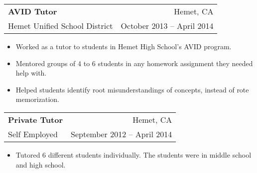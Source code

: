 \documentclass[12pt]{article}
\newenvironment{compactItemize}{
  \begin{itemize}[itemsep=0ex, parsep=0ex, partopsep=0ex, topsep= -7pt]
}{
  \end{itemize}
}
\newcommand{\jobInfo}[4]{
  \begingroup
  \setlength{\tabcolsep}{0ex}
  \begin{tabularx}{\linewidth}{X r}
    #1 & %
    #2\\ %
    #3 & %
    #4   %
  \end{tabularx}%
  \endgroup%
}
\begin{document}
\jobInfo{\textbf{AVID Tutor}}{Hemet, CA}{Hemet Unified School District}{October 2013 -- April 2014}
\begin{compactItemize}
  \item Worked as a tutor to students in Hemet High School's AVID program.
  \item Mentored groups of 4 to 6 students in any homework assignment they needed help with.
  \item Helped students identify root misunderstandings of concepts, instead of rote memorization.
\end{compactItemize}
\medskip

\jobInfo{\textbf{Private Tutor}}{Hemet, CA}{Self Employed}{September 2012 -- April 2014}
\begin{compactItemize}
  \item Tutored 6 different students individually.  The students were in middle school and high school. 
\end{compactItemize}
\medskip

\begin{comment}
\jobInfo{Lube Technician}{Provo, UT}{Jiffy Lube}{Summers 2015 and 2016}
\begin{compactItemize}
  \item Serviced up to 50 cars each day.
  \item Changed oil, rotated tires, replaced brake pads, checked and filled under-hood fluids.
  \item Performed basic inspections for wear and tear.
  \item Repaired windshield rock chips.
\end{compactItemize}
\medskip

\jobInfo{Gas Station Clerk}{Idyllwild, CA}{Idyllwild Garage}{Summer 2011 and May 2012 -- January 2013}
\begin{compactItemize}
  \item Depending on the shift, would open or close the store.
  \item Stocked shelves and updated inventory.
  \item Dispensed propane for customers with tanks.
  \item Serviced customers and kept the store clean.
\end{compactItemize}
\medskip

\jobInfo{Landscape Maintenance Crewmember}{K\&M Strategic Management}{Hemet, CA}{Summer 2011 and May 2012 -- January 2013}
\begin{compactItemize}
  \item Leaf-blew the parking lots and picked up trash at managed medical properties every morning.
  \item Weeded, raked, and maintained the landscape at properties.
  \item Cleaned out an empty strip mall in preparation for sale.
  \item Repainted fences, parking lines, and breakrooms.
\end{compactItemize}
\medskip
\end{comment}
\end{document}

